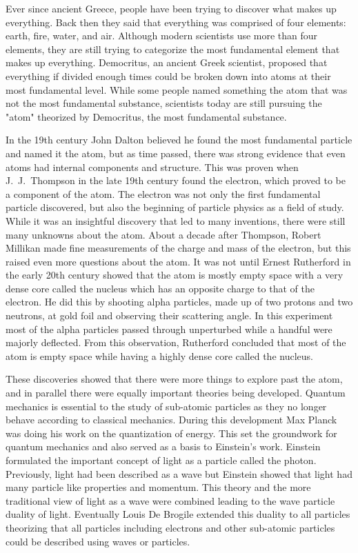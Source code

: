 Ever since ancient Greece, people have been trying to discover what makes up everything. Back then they said that everything was comprised of four elements: earth, fire, water, and air. Although modern scientists use more than four elements, they are still trying to categorize the most fundamental element that makes up everything. Democritus, an ancient Greek scientist, proposed that everything if divided enough times could be broken down into atoms at their most fundamental level. While some people named something the atom that was not the most fundamental substance, scientists today are still pursuing the "atom" theorized by Democritus, the most fundamental substance. 

In the 19th century John Dalton believed he found the most fundamental particle and named it the atom, but as time passed, there was strong evidence that even atoms had internal components and structure. This was proven when J.~J.~Thompson in the late 19th century found the electron, which proved to be a component of the atom. The electron was not only the first fundamental particle discovered, but also the beginning of particle physics as a field of study. While it was an insightful discovery that led to many inventions, there were still many unknowns about the atom. About a decade after Thompson, Robert Millikan made fine measurements of the charge and mass of the electron, but this raised even more questions about the atom. It was not until Ernest Rutherford in the early 20th century showed that the atom is mostly empty space with a very dense core called the nucleus which has an opposite charge to that of the electron. He did this by shooting alpha particles, made up of two protons and two neutrons, at gold foil and observing their scattering angle. In this experiment most of the alpha particles passed through unperturbed while a handful were majorly deflected. From this observation, Rutherford concluded that most of the atom is empty space while having a highly dense core called the nucleus. 

These discoveries showed that there were more things to explore past the atom, and in parallel there were equally important theories being developed. Quantum mechanics is essential to the study of sub-atomic particles as they no longer behave according to classical mechanics. During this development Max Planck was doing his work on the quantization of energy. This set the groundwork for quantum mechanics and also served as a basis to Einstein's work. Einstein formulated the important concept of light as a particle called the photon. Previously, light had been described as a wave but Einstein showed that light had many particle like properties and momentum. This theory and the more traditional view of light as a wave were combined leading to the wave particle duality of light. Eventually Louis De Brogile extended this duality to all particles theorizing that all particles including electrons and other sub-atomic particles could be described using waves or particles.

